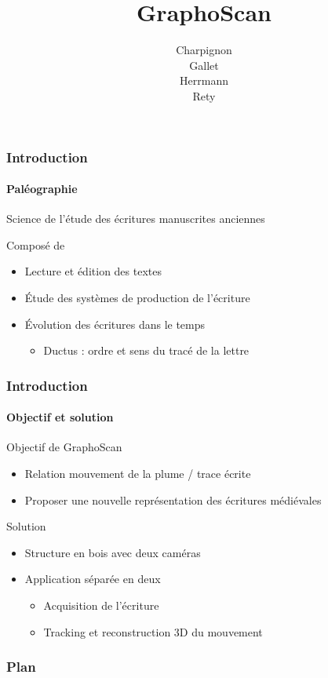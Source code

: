 \documentclass[12pt]{beamer}
\author{Charpignon \\Gallet \\Herrmann \\Rety\\}
\title{GraphoScan}
\institute[]{Université d'Orléans \\ \medskip \textit{Encadré par : Matthieu EXBRAYAT} }
\begin{document}
\begin{frame}
\titlepage
\end{frame}


\begin{frame}
\frametitle{Introduction}
\framesubtitle{Paléographie}
\begin{definition}
Science de l'étude des écritures manuscrites anciennes
\end{definition}
\begin{block}{Composé de}
\begin{itemize}
\item Lecture et édition des textes
\item Étude des systèmes de production de l'écriture
\item Évolution des écritures dans le temps
	\begin{itemize}
	\item Ductus : ordre et sens du tracé de la lettre
	\end{itemize}
\end{itemize}
\end{block}
\end{frame}

\begin{frame}
\frametitle{Introduction}
\framesubtitle{Objectif et solution}
\begin{block}{Objectif de GraphoScan}
\begin{itemize}
\item Relation mouvement de la plume / trace écrite
\item Proposer une nouvelle représentation des écritures médiévales
\end{itemize}
\end{block}

\begin{block}{Solution}
\begin{itemize}
\item Structure en bois avec deux caméras
\item Application séparée en deux
	\begin{itemize}
	\item Acquisition de l'écriture
	\item Tracking et reconstruction 3D du mouvement
	\end{itemize}
\end{itemize}
\end{block}
\end{frame}


\begin{frame}
\frametitle{Plan}
\tableofcontents
\end{frame}
\end{document}
